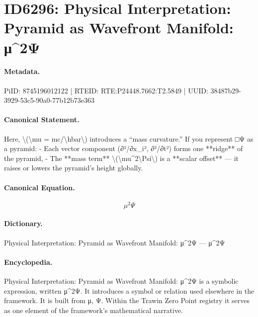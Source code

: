 \section*{ID6296: Physical Interpretation: Pyramid as Wavefront Manifold: μ\textasciicircum{}2Ψ}
\paragraph{Metadata.}
PiID: 8745196012122 | RTEID: RTE:P24448.7662:T2.5849 | UUID: 38487b29-3929-53c5-90a0-77b12b73e363

\paragraph{Canonical Statement.}
Here, \textbackslash{}(\textbackslash{}mu = mc/\textbackslash{}hbar\textbackslash{}) introduces a “mass curvature.” If you represent □Ψ as a pyramid: - Each vector component (∂²/∂x\_i², ∂²/∂t²) forms one **ridge** of the pyramid, - The **mass term** \textbackslash{}(\textbackslash{}mu\textasciicircum{}2\textbackslash{}Psi\textbackslash{}) is a **scalar offset** — it raises or lowers the pyramid’s height globally.

\paragraph{Canonical Equation.}
\[
\mu^2\Psi
\]

\paragraph{Dictionary.}
Physical Interpretation: Pyramid as Wavefront Manifold: μ\textasciicircum{}2Ψ — μ\textasciicircum{}2Ψ

\paragraph{Encyclopedia.}
Physical Interpretation: Pyramid as Wavefront Manifold: μ\textasciicircum{}2Ψ is a symbolic expression, written μ\textasciicircum{}2Ψ. It introduces a symbol or relation used elsewhere in the framework. It is built from μ, Ψ. Within the Trawin Zero Point registry it serves as one element of the framework's mathematical narrative.
